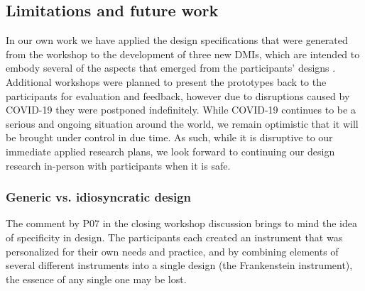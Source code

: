 \documentclass[letterpaper, 12pt]{article}
\begin{document}
\subsection{Limitations and future work}
\label{ch3-sec:limitations-and-future-work}


In our own work we have applied the design specifications that were generated from the workshop to the development of three new DMIs, which are intended to embody several of the aspects that emerged from the participants' designs \cite{Sullivan2020nime}. Additional workshops were planned to present the prototypes back to the participants for evaluation and feedback, however due to disruptions caused by COVID-19 they were postponed indefinitely. While COVID-19 continues to be a serious and ongoing situation around the world, we remain optimistic that it will be brought under control in due time. As such, while it is disruptive to our immediate applied research plans, we look forward to continuing our design research in-person with participants when it is safe. 


\subsubsection{Generic vs. idiosyncratic design}
\label{ch3-sec:generic-vs-idiosyncratic-design}

The comment by P07 in the closing workshop discussion brings to mind the idea of specificity in design. The participants each created an instrument that was personalized for their own needs and practice, and by combining elements of several different instruments into a single design (the Frankenstein instrument), the essence of any single one may be lost. 
\end{document}
